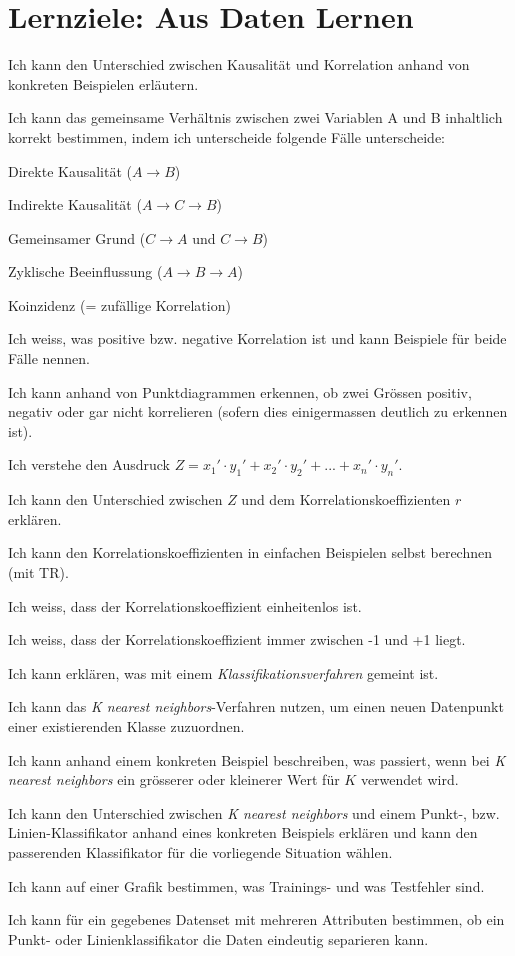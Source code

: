 \section*{Lernziele: Aus Daten Lernen}
\begin{todolist}
\item Ich kann den Unterschied zwischen Kausalität und Korrelation anhand von konkreten Beispielen erläutern.
\item Ich kann das gemeinsame Verhältnis zwischen zwei Variablen A und B inhaltlich korrekt bestimmen, indem ich unterscheide folgende Fälle unterscheide:
\begin{todolist}
\item Direkte Kausalität ($A\rightarrow B$)
\item Indirekte Kausalität ($A\rightarrow C\rightarrow B$)
\item Gemeinsamer Grund ($C\rightarrow A$ und $C\rightarrow B$)
\item Zyklische Beeinflussung ($A\rightarrow B \rightarrow A$)
\item Koinzidenz (= zufällige Korrelation)
\end{todolist}
\item Ich weiss, was positive bzw. negative Korrelation ist und kann Beispiele für beide Fälle nennen.
\item Ich kann anhand von Punktdiagrammen erkennen, ob zwei Grössen positiv,
negativ oder gar nicht korrelieren (sofern dies einigermassen deutlich zu
erkennen ist).
\item Ich verstehe den Ausdruck $Z=x_1'\cdot y_1'+x_2'\cdot y_2'+...+x_n'\cdot y_n'$.
\item Ich kann den Unterschied zwischen $Z$ und dem Korrelationskoeffizienten $r$ erklären.
\item Ich kann den Korrelationskoeffizienten in einfachen Beispielen selbst berechnen
(mit TR).
\item Ich weiss, dass der Korrelationskoeffizient einheitenlos ist.
\item Ich weiss, dass der Korrelationskoeffizient immer zwischen -1 und +1 liegt.
\item Ich kann erklären, was mit einem \textit{Klassifikationsverfahren} gemeint ist.
\item Ich kann das \textit{K nearest neighbors}-Verfahren nutzen, um einen neuen Datenpunkt einer existierenden Klasse zuzuordnen.
\item Ich kann anhand einem konkreten Beispiel beschreiben, was passiert, wenn bei \textit{K nearest neighbors} ein grösserer oder kleinerer Wert für $K$ verwendet wird.
\item Ich kann den Unterschied zwischen \textit{K nearest neighbors} und einem Punkt-, bzw. Linien-Klassifikator anhand eines konkreten Beispiels erklären und kann den passerenden Klassifikator für die vorliegende Situation wählen.
\item Ich kann auf einer Grafik bestimmen, was Trainings- und was Testfehler sind.
\item Ich kann für ein gegebenes Datenset mit mehreren Attributen bestimmen, ob ein Punkt- oder Linienklassifikator die Daten eindeutig separieren kann.
\end{todolist}
